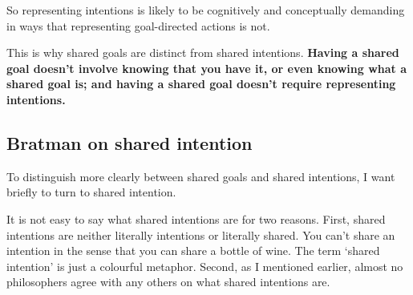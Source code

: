 \documentclass[14pt,a4paper]{extarticle}
\begin{document}
\begin{comment}
Having a shared goal involves being able to represent actions as goal-directed.  Let me take a moment to spell out what this means.  
A goal-directed action is a sequence of object-directed behaviours, such as reaching, pulling and twisting, where the sequence as a whole has a function which isn't a function of any of the parts.
Note especially that the goal can be thought of as a property of the action rather than as a state of the agent.
To represent actions as goal directed, then, involves being able to represent object-directed behaviours and being able to represent functions.  
It need not involve being able to represent intentions or indeed any kinds of goal state.

By contrast, intentions are ...
%
\begin{list}{*}{}

\item attitudes to propositions

\item conclusions of practical reasoning

\item elements of plans

\item distinguished from other attitudes, such as desire, by the norms of consistency that constitutively govern intending
\end{list}
%
\end{comment}
%
So representing intentions is likely to be cognitively and conceptually demanding in ways that representing goal-directed actions is not.

This is why shared goals are distinct from shared intentions.  
\textbf{Having a shared goal doesn't involve knowing that you have it, or even knowing what a shared goal is; and having a shared goal doesn't require representing intentions.}


\subsection{Bratman on shared intention}
To distinguish more clearly between shared goals and shared intentions, I want briefly to turn to shared intention.

It is not easy to say what shared intentions are for two reasons.  First, shared intentions are neither literally intentions or literally shared.  
You can't share an intention in the sense that you can share a bottle of wine.  
The term `shared intention' is just a colourful metaphor.  
Second, as I mentioned earlier, almost no philosophers agree with any others on what shared intentions are.
\end{document}
